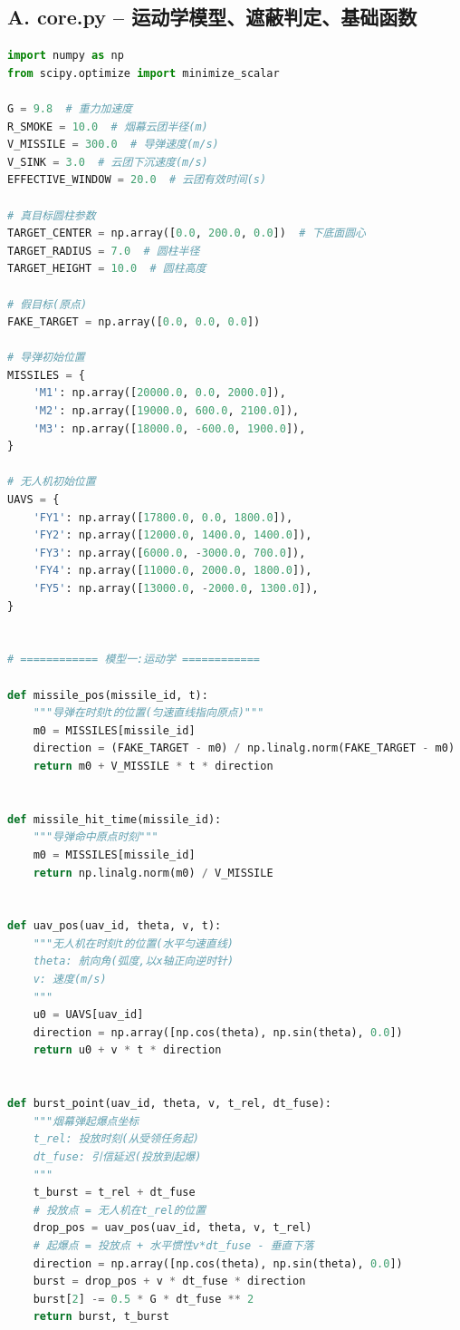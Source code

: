 \documentclass[12pt,a4paper]{article}
\begin{document}
\subsection{A. core.py -- 运动学模型、遮蔽判定、基础函数}
\begin{lstlisting}[language=Python, caption={A. core.py}]
import numpy as np
from scipy.optimize import minimize_scalar

G = 9.8  # 重力加速度
R_SMOKE = 10.0  # 烟幕云团半径(m)
V_MISSILE = 300.0  # 导弹速度(m/s)
V_SINK = 3.0  # 云团下沉速度(m/s)
EFFECTIVE_WINDOW = 20.0  # 云团有效时间(s)

# 真目标圆柱参数
TARGET_CENTER = np.array([0.0, 200.0, 0.0])  # 下底面圆心
TARGET_RADIUS = 7.0  # 圆柱半径
TARGET_HEIGHT = 10.0  # 圆柱高度

# 假目标(原点)
FAKE_TARGET = np.array([0.0, 0.0, 0.0])

# 导弹初始位置
MISSILES = {
    'M1': np.array([20000.0, 0.0, 2000.0]),
    'M2': np.array([19000.0, 600.0, 2100.0]),
    'M3': np.array([18000.0, -600.0, 1900.0]),
}

# 无人机初始位置
UAVS = {
    'FY1': np.array([17800.0, 0.0, 1800.0]),
    'FY2': np.array([12000.0, 1400.0, 1400.0]),
    'FY3': np.array([6000.0, -3000.0, 700.0]),
    'FY4': np.array([11000.0, 2000.0, 1800.0]),
    'FY5': np.array([13000.0, -2000.0, 1300.0]),
}


# ============ 模型一:运动学 ============

def missile_pos(missile_id, t):
    """导弹在时刻t的位置(匀速直线指向原点)"""
    m0 = MISSILES[missile_id]
    direction = (FAKE_TARGET - m0) / np.linalg.norm(FAKE_TARGET - m0)
    return m0 + V_MISSILE * t * direction


def missile_hit_time(missile_id):
    """导弹命中原点时刻"""
    m0 = MISSILES[missile_id]
    return np.linalg.norm(m0) / V_MISSILE


def uav_pos(uav_id, theta, v, t):
    """无人机在时刻t的位置(水平匀速直线)
    theta: 航向角(弧度,以x轴正向逆时针)
    v: 速度(m/s)
    """
    u0 = UAVS[uav_id]
    direction = np.array([np.cos(theta), np.sin(theta), 0.0])
    return u0 + v * t * direction


def burst_point(uav_id, theta, v, t_rel, dt_fuse):
    """烟幕弹起爆点坐标
    t_rel: 投放时刻(从受领任务起)
    dt_fuse: 引信延迟(投放到起爆)
    """
    t_burst = t_rel + dt_fuse
    # 投放点 = 无人机在t_rel的位置
    drop_pos = uav_pos(uav_id, theta, v, t_rel)
    # 起爆点 = 投放点 + 水平惯性v*dt_fuse - 垂直下落
    direction = np.array([np.cos(theta), np.sin(theta), 0.0])
    burst = drop_pos + v * dt_fuse * direction
    burst[2] -= 0.5 * G * dt_fuse ** 2
    return burst, t_burst



\end{lstlisting}
\end{document}
